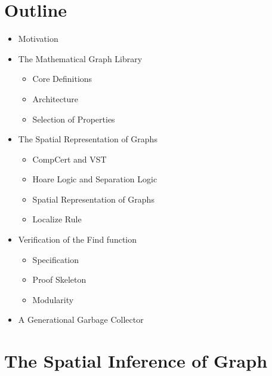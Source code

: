\documentclass[professionalfonts, xcolor=table]{beamer}
\begin{document}
\section{Outline}
\begin{frame}
  \begin{itemize}
  \item Motivation \hspace{1ex}\alert{\Large\checkmark}
  \item The Mathematical Graph Library \hspace{1ex}\alert{\Large\checkmark}
    \begin{itemize}
    \item Core Definitions \hspace{1ex}\alert{\Large\checkmark}
    \item Architecture \hspace{1ex}\alert{\Large\checkmark}
    \item Selection of Properties \hspace{1ex}\alert{\Large\checkmark}
    \end{itemize}
  \item The Spatial Representation of Graphs
    \begin{itemize}
    \item CompCert and VST
    \item Hoare Logic and Separation Logic
    \item Spatial Representation of Graphs
    \item Localize Rule
    \end{itemize}
  \item Verification of the Find function
    \begin{itemize}
    \item Specification
    \item Proof Skeleton
    \item Modularity
    \end{itemize}
  \item A Generational Garbage Collector
  \end{itemize}
\end{frame}

\section{The Spatial Inference of Graph}
\end{document}
